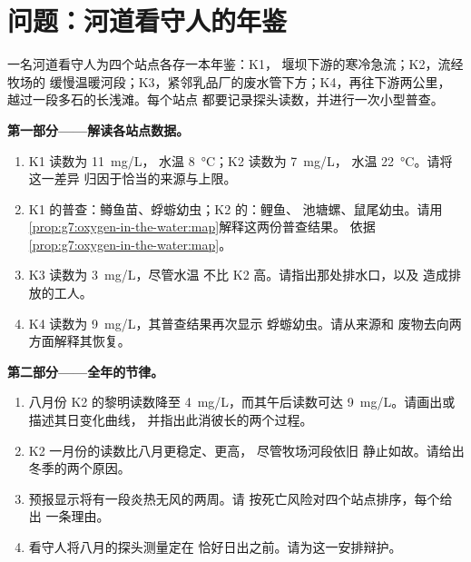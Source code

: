 \section{问题：河道看守人的年鉴}

\begin{problem}\label{pb:g7:oxygen-in-the-water:1}
一名河道看守人为四个站点各存一本年鉴：K1，
堰坝下游的寒冷急流；K2，流经牧场的
缓慢温暖河段；K3，紧邻乳品厂的废水管下方；K4，再往下游两公里，
越过一段多石的长浅滩。每个站点
都要记录探头读数，并进行一次小型普查。

\medskip\noindent\textbf{第一部分——解读各站点数据。}
\begin{enumerate}
  \item K1 读数为 \qty{11}{mg/L}，
        水温 \qty{8}{\degreeCelsius}；K2 读数为 \qty{7}{mg/L}，
        水温 \qty{22}{\degreeCelsius}。请将这一差异
        归因于恰当的来源与上限。
  \item K1 的普查：鳟鱼苗、蜉蝣幼虫；K2 的：鲤鱼、
        池塘螺、鼠尾幼虫。请用\cref{prop:g7:oxygen-in-the-water:map}解释这两份普查结果。
        依据\cref{prop:g7:oxygen-in-the-water:map}。
  \item K3 读数为 \qty{3}{mg/L}，尽管水温
        不比 K2 高。请指出那处排水口，以及
        造成排放的工人。
  \item K4 读数为 \qty{9}{mg/L}，其普查结果再次显示
        蜉蝣幼虫。请从来源和
        废物去向两方面解释其恢复。
\end{enumerate}

\medskip\noindent\textbf{第二部分——全年的节律。}
\begin{enumerate}[resume]
  \item 八月份 K2 的黎明读数降至
        \qty{4}{mg/L}，而其午后读数可达
        \qty{9}{mg/L}。请画出或描述其日变化曲线，
        并指出此消彼长的两个过程。
  \item K2 一月份的读数比八月更稳定、更高，
        尽管牧场河段依旧
        静止如故。请给出冬季的两个原因。
  \item 预报显示将有一段炎热无风的两周。请
        按死亡风险对四个站点排序，每个给出
        一条理由。
  \item 看守人将八月的探头测量定在
        恰好日出之前。请为这一安排辩护。
\end{enumerate}


\end{problem}
